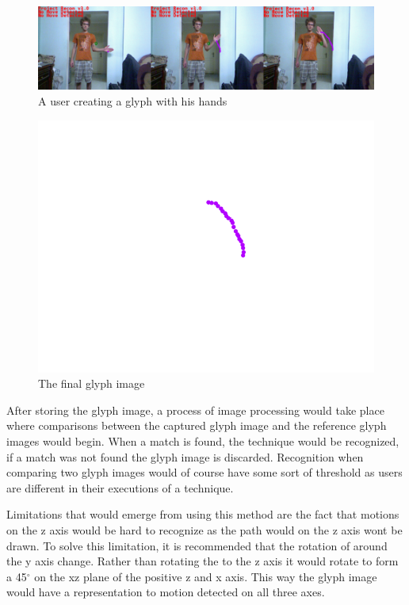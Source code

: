 \begin{figure}[!htbp]
\centering
\includegraphics[width=1\textwidth]{images/glyphfinal.png}
\caption{A user creating a glyph with his hands}
\label{glyph}
\end{figure}

\begin{figure}[!htbp]
\centering
\includegraphics[width=1\textwidth]{images/glyph.png}
\caption{The final glyph image}
\label{glyph2}
\end{figure}

After storing the glyph image, a process of image processing would take place where comparisons between the captured glyph image and the reference glyph images would begin. When a match is found, the technique would be recognized, if a match was not found the glyph image is discarded. Recognition when comparing two glyph images would of course have some sort of threshold as users are different in their executions of a technique.

Limitations that would emerge from using this method are the fact that motions on the z axis would be hard to recognize as the path would on the z axis wont be drawn. To solve this limitation, it is recommended that the rotation of \N around the y axis change. Rather than rotating the \N to the z axis it would rotate to form a 45$^\circ$ on the xz plane of the positive z and x axis. This way the glyph image would have a representation to motion detected on all three axes.

